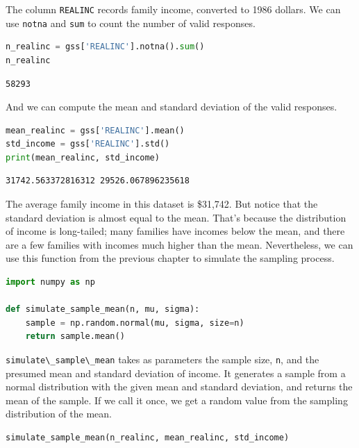 The column \passthrough{\lstinline!REALINC!} records family income,
converted to 1986 dollars. We can use \passthrough{\lstinline!notna!}
and \passthrough{\lstinline!sum!} to count the number of valid
responses.

\begin{lstlisting}[language=Python]
n_realinc = gss['REALINC'].notna().sum()
n_realinc
\end{lstlisting}

\begin{lstlisting}[]
58293
\end{lstlisting}

And we can compute the mean and standard deviation of the valid
responses.

\begin{lstlisting}[language=Python]
mean_realinc = gss['REALINC'].mean()
std_income = gss['REALINC'].std()
print(mean_realinc, std_income)
\end{lstlisting}

\begin{lstlisting}[]
31742.563372816312 29526.067896235618
\end{lstlisting}

The average family income in this dataset is \$31,742. But notice that
the standard deviation is almost equal to the mean. That's because the
distribution of income is long-tailed; many families have incomes below
the mean, and there are a few families with incomes much higher than the
mean. Nevertheless, we can use this function from the previous chapter
to simulate the sampling process.

\begin{lstlisting}[language=Python]
import numpy as np

def simulate_sample_mean(n, mu, sigma):
    sample = np.random.normal(mu, sigma, size=n)
    return sample.mean()
\end{lstlisting}

\passthrough{\lstinline!simulate\_sample\_mean!} takes as parameters the
sample size, \passthrough{\lstinline!n!}, and the presumed mean and
standard deviation of income. It generates a sample from a normal
distribution with the given mean and standard deviation, and returns the
mean of the sample. If we call it once, we get a random value from the
sampling distribution of the mean.

\begin{lstlisting}[language=Python]
simulate_sample_mean(n_realinc, mean_realinc, std_income)
\end{lstlisting}

